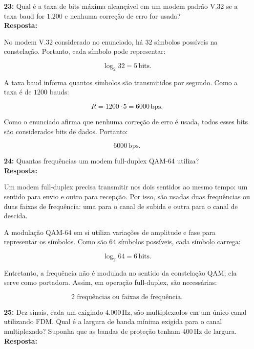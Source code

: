\documentclass[12pt,a4paper]{report}
\begin{document}
\vspace{0.6cm}

\noindent \textbf{23:} Qual é a taxa de bits máxima alcançável em um modem padrão V.32 se a taxa baud for $1.200$ e nenhuma correção de erro for usada?\\
\textbf{Resposta:}

No modem V.32 considerado no enunciado, há $32$ símbolos possíveis na constelação. Portanto, cada símbolo pode representar:

\[
\log_2 32 = 5\,\text{bits}.
\]

A taxa baud informa quantos símbolos são transmitidos por segundo. Como a taxa é de $1200$ bauds:

\[
R = 1200 \cdot 5 = 6000\,\text{bps}.
\]

Como o enunciado afirma que nenhuma correção de erro é usada, todos esses bits são considerados bits de dados. Portanto:

\[
\boxed{6000\,\text{bps}}.
\]


\vspace{0.6cm}

\noindent \textbf{24:} Quantas frequências um modem full-duplex QAM-64 utiliza?\\
\textbf{Resposta:}

Um modem full-duplex precisa transmitir nos dois sentidos ao mesmo tempo: um sentido para envio e outro para recepção. Por isso, são usadas duas frequências ou duas faixas de frequência: uma para o canal de subida e outra para o canal de descida.

A modulação QAM-64 em si utiliza variações de amplitude e fase para representar os símbolos. Como são $64$ símbolos possíveis, cada símbolo carrega:

\[
\log_2 64 = 6\,\text{bits}.
\]

Entretanto, a frequência não é modulada no sentido da constelação QAM; ela serve como portadora. Assim, em operação full-duplex, são necessárias:

\[
\boxed{2\text{ frequências ou faixas de frequência}}.
\]


\vspace{0.6cm}

\noindent \textbf{25:} Dez sinais, cada um exigindo $4.000\,\text{Hz}$, são multiplexados em um único canal utilizando FDM. Qual é a largura de banda mínima exigida para o canal multiplexado? Suponha que as bandas de proteção tenham $400\,\text{Hz}$ de largura.\\
\textbf{Resposta:}
\end{document}
